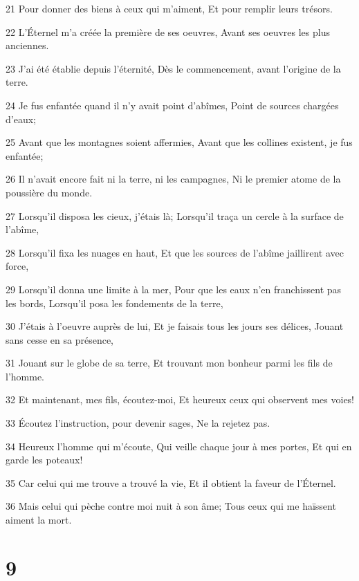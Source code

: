 \par 21 Pour donner des biens à ceux qui m'aiment, Et pour remplir leurs trésors.
\par 22 L'Éternel m'a créée la première de ses oeuvres, Avant ses oeuvres les plus anciennes.
\par 23 J'ai été établie depuis l'éternité, Dès le commencement, avant l'origine de la terre.
\par 24 Je fus enfantée quand il n'y avait point d'abîmes, Point de sources chargées d'eaux;
\par 25 Avant que les montagnes soient affermies, Avant que les collines existent, je fus enfantée;
\par 26 Il n'avait encore fait ni la terre, ni les campagnes, Ni le premier atome de la poussière du monde.
\par 27 Lorsqu'il disposa les cieux, j'étais là; Lorsqu'il traça un cercle à la surface de l'abîme,
\par 28 Lorsqu'il fixa les nuages en haut, Et que les sources de l'abîme jaillirent avec force,
\par 29 Lorsqu'il donna une limite à la mer, Pour que les eaux n'en franchissent pas les bords, Lorsqu'il posa les fondements de la terre,
\par 30 J'étais à l'oeuvre auprès de lui, Et je faisais tous les jours ses délices, Jouant sans cesse en sa présence,
\par 31 Jouant sur le globe de sa terre, Et trouvant mon bonheur parmi les fils de l'homme.
\par 32 Et maintenant, mes fils, écoutez-moi, Et heureux ceux qui observent mes voies!
\par 33 Écoutez l'instruction, pour devenir sages, Ne la rejetez pas.
\par 34 Heureux l'homme qui m'écoute, Qui veille chaque jour à mes portes, Et qui en garde les poteaux!
\par 35 Car celui qui me trouve a trouvé la vie, Et il obtient la faveur de l'Éternel.
\par 36 Mais celui qui pèche contre moi nuit à son âme; Tous ceux qui me haïssent aiment la mort.

\chapter{9}

